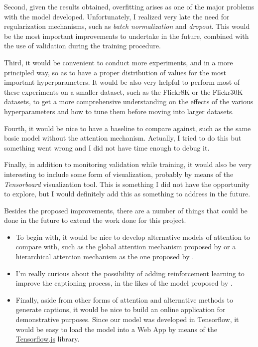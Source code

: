 Second, given the results obtained, overfitting arises as one of the major problems with the model developed. Unfortunately, I realized very late the need for regularization mechanisms, such as \textit{batch normalization} and \textit{dropout}. This would be the most important improvements to undertake in the future, combined with the use of validation during the training procedure.

Third, it would be convenient to conduct more experiments, and in a more principled way, so as to have a proper distribution of values for the most important hyperparameters. It would be also very helpful to perform most of these experiments on a smaller dataset, such as the Flickr8K or the Flickr30K datasets, to get a more comprehensive understanding on the effects of the various hyperparameters and how to tune them before moving into larger datasets. 

Fourth, it would be nice to have a baseline to compare against, such as the same basic model without the attention mechanism. Actually, I tried to do this but something went wrong and I did not have time enough to debug it.

Finally, in addition to monitoring validation while training, it would also be very interesting to include some form of visualization, probably by means of the \textit{Tensorboard} visualization tool. This is something I did not have the opportunity to explore, but I would definitely add this as something to address in the future.

Besides the proposed improvements, there are a number of things that could be done in the future to extend the work done for this project.

\begin{itemize}
    \item To begin with, it would be nice to develop alternative models of attention to compare with, such as the global attention mechanism proposed by \citet{Luong2015} or a hierarchical attention mechanism as the one proposed by \citet{Khademi2018}.
    \item I'm really curious about the possibility of adding reinforcement learning to improve the captioning process, in the likes of the model proposed by \citet{Rennie2017}.
    \item Finally, aside from other forms of attention and alternative methods to generate captions, it would be nice to build an online application for demonstrative purposes. Since our model was developed in Tensorflow, it would be easy to load the model into a Web App by means of the \href{https://www.tensorflow.org/js}{Tensorflow.js} library.
\end{itemize}

